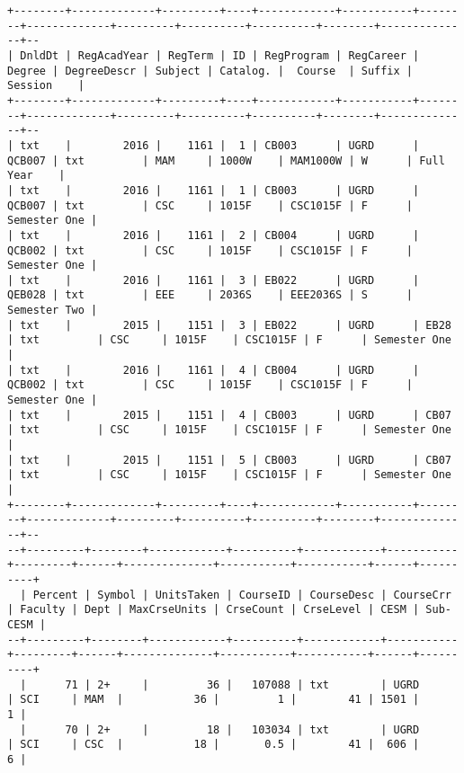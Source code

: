 \begin{sidewaysfigure}
  \centering
  \begin{mdframed}[topline=false,rightline=false,leftline=false]
    \centering
\begin{BVerbatim}
+--------+-------------+---------+----+------------+-----------+--------+-------------+---------+----------+----------+--------+--------------+--
| DnldDt | RegAcadYear | RegTerm | ID | RegProgram | RegCareer | Degree | DegreeDescr | Subject | Catalog. |  Course  | Suffix |   Session    |
+--------+-------------+---------+----+------------+-----------+--------+-------------+---------+----------+----------+--------+--------------+--
| txt    |        2016 |    1161 |  1 | CB003      | UGRD      | QCB007 | txt         | MAM     | 1000W    | MAM1000W | W      | Full Year    |
| txt    |        2016 |    1161 |  1 | CB003      | UGRD      | QCB007 | txt         | CSC     | 1015F    | CSC1015F | F      | Semester One |
| txt    |        2016 |    1161 |  2 | CB004      | UGRD      | QCB002 | txt         | CSC     | 1015F    | CSC1015F | F      | Semester One |
| txt    |        2016 |    1161 |  3 | EB022      | UGRD      | QEB028 | txt         | EEE     | 2036S    | EEE2036S | S      | Semester Two |
| txt    |        2015 |    1151 |  3 | EB022      | UGRD      | EB28   | txt         | CSC     | 1015F    | CSC1015F | F      | Semester One |
| txt    |        2016 |    1161 |  4 | CB004      | UGRD      | QCB002 | txt         | CSC     | 1015F    | CSC1015F | F      | Semester One |
| txt    |        2015 |    1151 |  4 | CB003      | UGRD      | CB07   | txt         | CSC     | 1015F    | CSC1015F | F      | Semester One |
| txt    |        2015 |    1151 |  5 | CB003      | UGRD      | CB07   | txt         | CSC     | 1015F    | CSC1015F | F      | Semester One |
+--------+-------------+---------+----+------------+-----------+--------+-------------+---------+----------+----------+--------+--------------+--
--+---------+--------+------------+----------+------------+-----------+---------+------+--------------+-----------+-----------+------+----------+
  | Percent | Symbol | UnitsTaken | CourseID | CourseDesc | CourseCrr | Faculty | Dept | MaxCrseUnits | CrseCount | CrseLevel | CESM | Sub-CESM |
--+---------+--------+------------+----------+------------+-----------+---------+------+--------------+-----------+-----------+------+----------+
  |      71 | 2+     |         36 |   107088 | txt        | UGRD      | SCI     | MAM  |           36 |         1 |        41 | 1501 |        1 |
  |      70 | 2+     |         18 |   103034 | txt        | UGRD      | SCI     | CSC  |           18 |       0.5 |        41 |  606 |        6 |

\end{BVerbatim}
\end{mdframed}
\end{sidewaysfigure}
